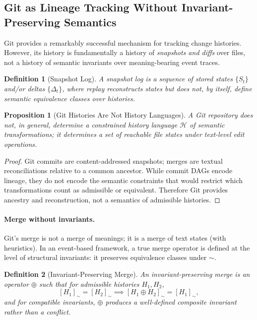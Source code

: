\documentclass[11pt]{article}
\newtheorem{definition}{Definition}
\newtheorem{proposition}{Proposition}
\begin{document}
\subsection{Git as Lineage Tracking Without Invariant-Preserving Semantics}

Git provides a remarkably successful mechanism for tracking change histories. However, its history is fundamentally a history of \emph{snapshots and diffs} over files, not a history of semantic invariants over meaning-bearing event traces.

\begin{definition}[Snapshot Log]
A \emph{snapshot log} is a sequence of stored states $\{S_t\}$ and/or deltas $\{\Delta_t\}$, where replay reconstructs states but does not, by itself, define semantic equivalence classes over histories.
\end{definition}

\begin{proposition}[Git Histories Are Not History Languages]
A Git repository does not, in general, determine a constrained history language $\mathcal{H}$ of semantic transformations; it determines a set of reachable file states under text-level edit operations.
\end{proposition}

\begin{proof}
Git commits are content-addressed snapshots; merges are textual reconciliations relative to a common ancestor. While commit DAGs encode lineage, they do not encode the semantic constraints that would restrict which transformations count as admissible or equivalent. Therefore Git provides ancestry and reconstruction, not a semantics of admissible histories.
\end{proof}

\paragraph{Merge without invariants.}
Git’s merge is not a merge of meanings; it is a merge of text states (with heuristics). In an event-based framework, a true merge operator is defined at the level of structural invariants: it preserves equivalence classes under $\sim$.

\begin{definition}[Invariant-Preserving Merge]
An \emph{invariant-preserving merge} is an operator $\oplus$ such that for admissible histories $H_1,H_2$,
\[
[H_1]_{\sim} = [H_2]_{\sim} \implies [H_1 \oplus H_2]_{\sim} = [H_1]_{\sim},
\]
and for compatible invariants, $\oplus$ produces a well-defined composite invariant rather than a conflict.
\end{definition}
\end{document}
